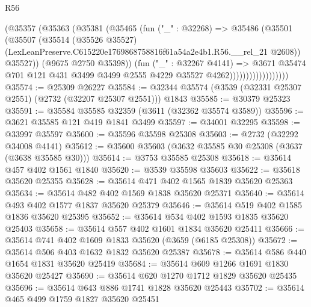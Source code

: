 \begin{lexlean}{R56}
\begin{coremodule}
                              (@35357
                                (@35363
                                  (@35381
                                    (@35465
                                      (fun ("_" : @32268) =>
                                      @35486
                                        (@35501
                                          (@35507
                                            (@35514
                                              (@35526 @35527)
                                              (LexLeanPreserve.C615220e1769868758816f61a54a2e4b1.R56.__rel_21
                                                @2608))
                                            @35527))
                                        (@9675 @2750 @35398))
                                      (fun ("_" : @32267 @4141) =>
                                      @3671
                                        @35474
                                        @701
                                        @121
                                        @431
                                        @3499
                                        @3499
                                        @2555
                                        @4229
                                        @35527
                                        @4262))))))))))))))))))
@35574 := @25309 @26227
@35584 := @32344 @35574 (@3539 (@32331 @25307 @2551) (@2732 (@32207 @25307 @2551))) @1843
@35585 := @30379 @25323
@35591 := @35584 @35585 @32359 (@3611 (@32362 @35574 @3589))
@35596 := @3621 @35585 @121 @419 @1841 @3499
@35597 := @34001 @32295
@35598 := @33997 @35597
@35600 := @35596 @35598 @25308
@35603 := @2732 (@32292 @34008 @4141)
@35612 := @35600 @35603 (@3632 @35585 @30 @25308 (@3637 (@3638 @35585 @30)))
@35614 := @3753 @35585 @25308
@35618 := @35614 @457 @402 @1561 @1840
@35620 := @3539 @35598 @35603
@35622 := @35618 @35620 @25355
@35628 := @35614 @471 @402 @1565 @1839 @35620 @25363
@35634 := @35614 @482 @402 @1569 @1838 @35620 @25371
@35640 := @35614 @493 @402 @1577 @1837 @35620 @25379
@35646 := @35614 @519 @402 @1585 @1836 @35620 @25395
@35652 := @35614 @534 @402 @1593 @1835 @35620 @25403
@35658 := @35614 @557 @402 @1601 @1834 @35620 @25411
@35666 := @35614 @741 @402 @1609 @1833 @35620 (@3659 (@6185 @25308))
@35672 := @35614 @506 @403 @1632 @1832 @35620 @25387
@35678 := @35614 @586 @440 @1654 @1831 @35620 @25419
@35684 := @35614 @609 @1266 @1691 @1830 @35620 @25427
@35690 := @35614 @620 @1270 @1712 @1829 @35620 @25435
@35696 := @35614 @643 @886 @1741 @1828 @35620 @25443
@35702 := @35614 @465 @499 @1759 @1827 @35620 @25451

\end{coremodule}
\end{lexlean}
